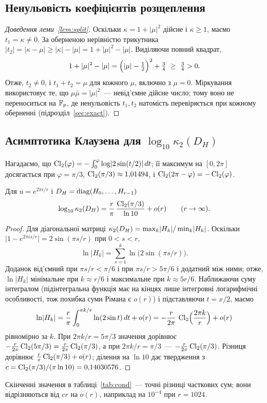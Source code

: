 \documentclass[11pt]{article}
\theoremstyle{plain}
\DeclareMathOperator{\diag}{diag}
\newcommand{\abs}[1]{\lvert #1\rvert}
\begin{document}
\subsection{Ненульовість коефіцієнтів розщеплення}\label{app:kappa}
\begin{proof}[Доведення леми~\ref{lem:split}]
Оскільки $\kappa=1+\abs{\mu}^2$ дійсне і $\kappa\ge1$, маємо $t_1=\kappa\ne0$. За оберненою нерівністю трикутника $\abs{t_2}=\abs{\kappa-\mu}\ge\abs{\kappa}-\abs{\mu}=1+\abs{\mu}^2-\abs{\mu}$. Виділяючи повний квадрат,
\[
1+\abs{\mu}^2-\abs{\mu}=\Bigl(\abs{\mu}-\tfrac12\Bigr)^2+\tfrac34\ \ge\ \tfrac34>0 .
\]
Отже, $t_2\ne0$, і $t_1+t_2=\mu$ для кожного $\mu$, включно з $\mu=0$. Міркування використовує те, що $\mu\bar\mu=\abs{\mu}^2$~--- невід'ємне дійсне число; тому воно не переноситься на $\mathbb{F}_p$, де ненульовість $t_1,t_2$ натомість перевіряється при кожному оберненні (підрозділ~\ref{sec:exact}).
\end{proof}

\subsection{Асимптотика Клаузена для \texorpdfstring{$\log_{10}\kappa_2(D_H)$}{log10 kappa2(DH)}}\label{app:clausen}
Нагадаємо, що $\Cl(\varphi)=-\int_0^{\varphi}\log\abs{2\sin(t/2)}\,dt$; її максимум на $[0,2\pi]$ досягається при $\varphi=\pi/3$, $\operatorname{Cl}_2(\pi/3)\approx1{,}01494$, і $\operatorname{Cl}_2(2\pi-\varphi)=-\operatorname{Cl}_2(\varphi)$.
\begin{proposition}\label{prop:clausen}
Для $u=e^{2\pi i/r}$ і $\Dh=\diag(H_0,\dots,H_{r-1})$
\[
\log_{10}\kappa_2(D_H)=\frac{r}{\pi}\,\frac{\operatorname{Cl}_2(\pi/3)}{\ln10}+o(r)\qquad(r\to\infty).
\]
\end{proposition}
\begin{proof}
Для діагональної матриці $\kappa_2(\Dh)=\max_k\abs{H_k}/\min_k\abs{H_k}$. Оскільки $\abs{1-e^{2\pi is/r}}=2\sin(\pi s/r)$ при $0<s<r$,
\[
\ln\abs{H_k}=\sum_{s=1}^{k}\ln\bigl(2\sin(\pi s/r)\bigr).
\]
Доданок від'ємний при $\pi s/r<\pi/6$ і при $\pi s/r>5\pi/6$ і додатний між ними; отже, $\ln\abs{H_k}$ мінімальне при $k\approx r/6$ і максимальне при $k\approx5r/6$. Наближаючи суму інтегралом (підінтегральна функція має на кінцях лише інтегровні логарифмічні особливості, тож похибка суми Рімана є $o(r)$) і підставляючи $t=x/2$, маємо
\[
\ln\abs{H_k}=\frac{r}{\pi}\int_0^{\pi k/r}\ln(2\sin t)\,dt+o(r)=-\frac{r}{2\pi}\,\Cl\Bigl(\frac{2\pi k}{r}\Bigr)+o(r)
\]
рівномірно за $k$. При $2\pi k/r=5\pi/3$ значення дорівнює $-\frac{r}{2\pi}\operatorname{Cl}_2(5\pi/3)=\frac{r}{2\pi}\operatorname{Cl}_2(\pi/3)$, а при $2\pi k/r=\pi/3$~--- $-\frac{r}{2\pi}\operatorname{Cl}_2(\pi/3)$. Різниця дорівнює $\frac{r}{\pi}\operatorname{Cl}_2(\pi/3)+o(r)$; ділення на $\ln10$ дає твердження з $c=\operatorname{Cl}_2(\pi/3)/(\pi\ln10)=0{,}14030576$.
\end{proof}
Скінченні значення в таблиці~\ref{tab:cond}~--- точні різниці часткових сум; вони відрізняються від $cr$ на $o(r)$, наприклад на $10^{-4}$ при $r=1024$.
\end{document}
